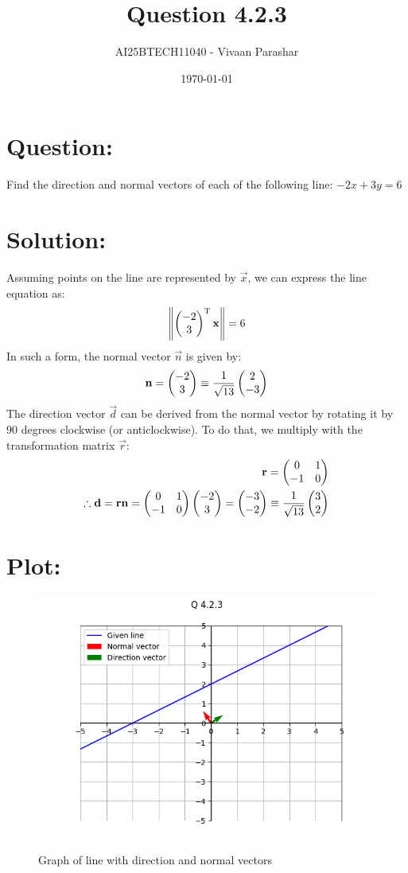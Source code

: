 \documentclass[a4paper, 12pt]{article}
\title{Question 4.2.3}
\author{AI25BTECH11040 - Vivaan Parashar}
\date{\today}
\begin{document}
\maketitle

\section{Question: }
Find the direction and normal vectors of each of the following line: $-2x + 3y = 6$

\section{Solution: }
Assuming points on the line are represented by $\vec{x}$, we can express the line equation as:
\begin{align}
    \left\lVert\begin{pmatrix}-2 \\ 3\end{pmatrix}^{\mathrm{T}}\mathbf{x}\right\rVert = 6
\end{align}
In such a form, the normal vector $\vec{n}$ is given by:
\begin{align}
    \mathbf{n} = \begin{pmatrix}-2 \\ 3\end{pmatrix} \equiv \frac{1}{\sqrt{13}}\begin{pmatrix}2 \\ -3\end{pmatrix}
\end{align}
The direction vector $\vec{d}$ can be derived from the normal vector by rotating it by 90 degrees clockwise (or anticlockwise). To do that, we multiply with the transformation matrix $\vec{r}$:
\begin{align}
    \mathbf{r} = \begin{pmatrix}0 & 1 \\ -1 & 0\end{pmatrix}\\
    \therefore \mathbf{d} = \mathbf{r}\mathbf{n} = \begin{pmatrix}0 & 1 \\ -1 & 0\end{pmatrix}\begin{pmatrix}-2 \\ 3\end{pmatrix} = \begin{pmatrix}-3 \\ -2\end{pmatrix} \equiv \frac{1}{\sqrt{13}}\begin{pmatrix}3 \\ 2\end{pmatrix}
\end{align}

\section{Plot: }
\begin{figure}[h!]
    \centering
    \includegraphics[width=\columnwidth]{figs/plot.png}
    \caption{Graph of line with direction and normal vectors}
    \label{fig:4.2.3}
\end{figure}
\end{document}
